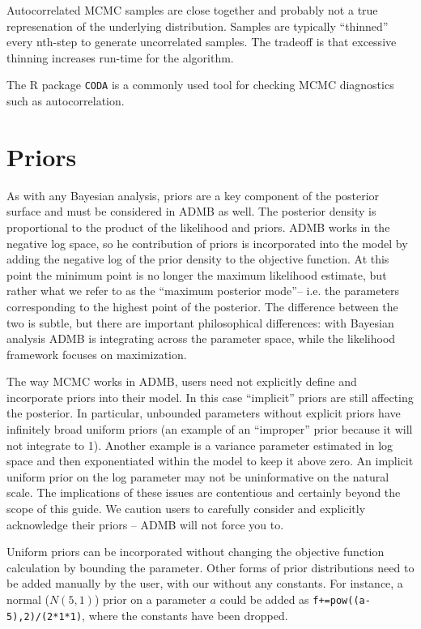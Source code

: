 \documentclass{article}\usepackage[]{graphicx}\usepackage[]{color}
\begin{document}
Autocorrelated MCMC samples are close together and probably
not a true represenation of the underlying
distribution. Samples are typically ``thinned'' every
nth-step to generate uncorrelated samples. The tradeoff is
that excessive thinning increases run-time for the
algorithm.

The R package \texttt{CODA} is a commonly used tool for
checking MCMC diagnostics such as autocorrelation.

\section{Priors}
As with any Bayesian analysis, priors are a key component of
the posterior surface and must be considered in ADMB as
well. The posterior density is proportional to the product
of the likelihood and priors. ADMB works in the negative log
space, so he contribution of priors is incorporated into the
model by adding the negative log of the prior density to the
objective function. At this point the minimum point is no
longer the maximum likelihood estimate, but rather what we
refer to as the ``maximum posterior mode''-- i.e. the
parameters corresponding to the highest point of the
posterior. The difference between the two is subtle, but
there are important philosophical differences: with Bayesian
analysis ADMB is integrating across the parameter space,
while the likelihood framework focuses on maximization.

The way MCMC works in ADMB, users need not explicitly define
and incorporate priors into their model. In this case
``implicit'' priors are still affecting the posterior. In
particular, unbounded parameters without explicit priors
have infinitely broad uniform priors (an example of an
``improper'' prior because it will not integrate to
1). Another example is a variance parameter estimated in log
space and then exponentiated within the model to keep it
above zero. An implicit uniform prior on the log parameter
may not be uninformative on the natural scale. The
implications of these issues are contentious and certainly
beyond the scope of this guide. We caution users to
carefully consider and explicitly acknowledge their priors
-- ADMB will not force you to.

Uniform priors can be incorporated without changing the
objective function calculation by bounding the
parameter. Other forms of prior distributions need to be
added manually by the user, with our without any
constants. For instance, a normal ($N(5,1)$) prior on a
parameter $a$ could be added as
\texttt{f+=pow((a-5),2)/(2*1*1)}, where the constants have
been dropped.
\end{document}
